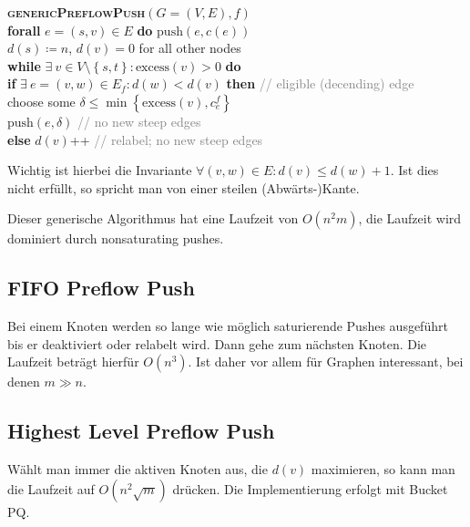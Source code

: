 \begin{pseudocode}
  \textbf{\textsc{genericPreflowPush}}\( (G = (V, E), f) \) \\
  \phantom{\enskip} \textbf{forall} \( e = (s,v) \in E \) \textbf{do} \( \text{push}(e, c(e)) \) \\
  \phantom{\enskip} \( d(s) \coloneqq n \), \( d(v) = 0 \) for all other nodes \\
  \phantom{\enskip} \textbf{while} \( \exists \ v \in V \setminus \left \{ s, t \right \} : \text{excess}(v) > 0 \) \textbf{do} \\
  \phantom{\enskip} \phantom{\enskip} \textbf{if} \( \exists \ e = (v,w) \in E_f : d(w) < d(v) \) \textbf{then} \enskip \textcolor{gray}{// eligible (decending) edge} \\
  \phantom{\enskip} \phantom{\enskip} \phantom{\enskip} choose some \( \delta \leq \min \left \{ \text{excess}(v), c_e^f \right \} \) \\
  \phantom{\enskip} \phantom{\enskip} \phantom{\enskip} \( \text{push}(e,\delta) \) \enskip \textcolor{gray}{// no new steep edges} \\
  \phantom{\enskip} \phantom{\enskip} \textbf{else} \( d(v) \)++ \enskip \textcolor{gray}{// relabel; no new steep edges}
  \phantom{\enskip}
\end{pseudocode}

Wichtig ist hierbei die Invariante $\forall (v,w) \in E: d(v) \leq d(w)+1$. Ist dies nicht erfüllt, so spricht man von einer steilen (Abwärts-)Kante. 

Dieser generische Algorithmus hat eine Laufzeit von \( O(n^2m) \), die Laufzeit wird dominiert durch nonsaturating pushes.

\subsection{FIFO Preflow Push}

Bei einem Knoten werden so lange wie möglich saturierende Pushes ausgeführt bis er deaktiviert oder relabelt wird. Dann gehe zum nächsten Knoten. Die Laufzeit beträgt hierfür $O(n^{3})$. Ist daher vor allem für Graphen interessant, bei denen $m \gg n$.


\subsection{Highest Level Preflow Push}

Wählt man immer die aktiven Knoten aus, die \( d(v) \) maximieren, so kann man die Laufzeit auf \( O(n^2\sqrt{m}) \) drücken. Die Implementierung erfolgt mit Bucket PQ.


